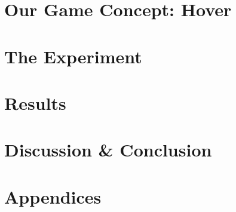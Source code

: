 \documentclass[english, a4paper, 12pt, twoside]{article}
\numberwithin{equation}{section} %
\begin{document}
\part{Our Game Concept: Hover}
\label{part:hover}



\part{The Experiment}
\label{part:experiment}



\part{Results}
\label{part:results}



\part{Discussion \& Conclusion}
\label{part:discussion}


\newpage
\renewcommand\refname{References} %
{ %
}

\newpage
\appendix
\pagestyle{appendixstyle}
\part*{Appendices}

\renewcommand{\thesection}{\Alph{section}}


\end{document}
